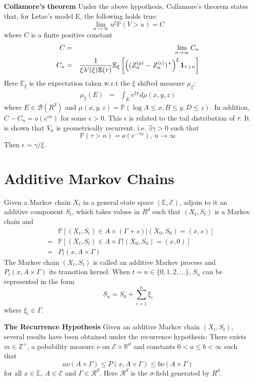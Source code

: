 \documentclass[12pt]{article}
\newcommand{\E}{
        \mathbb{E}
}
\newcommand{\p}{
        \mathbb{P}
}
\newcommand{\I}[1]{
        \mathbf 1_{#1}
}
\begin{document}
{\bf Collamore's theorem}
Under the above hypothesis, Collamore's theorem states that, for
Letac's model E, the following holds true:
\[
\lim_{u \to \infty} u^\xi \p(V > u) = C
\]
where $C$ is a finite positive constant
\begin{eqnarray*}
  C &=& \lim_{n \to \infty} C_n \\
  C_n &=&     {1 \over \xi \lambda'(\xi) \E(\tau)}
    \E_\xi \left[
    \left(
    (Z^{(p)}_n - Z^{(c)}_n)^+
    \right)^\xi \I{\tau > n}
    \right]
\end{eqnarray*}
Here $\E_{\xi}$ is the expectation taken w.r.t the $\xi$ shifted
measure $\mu_\xi$:
\begin{eqnarray*}
  \mu_\xi(E) &=& \int_E e^{\xi x} d\mu(x, y, z)
\end{eqnarray*}
where $E \in \mathcal B(R^3)$ and $\mu(x, y, z) = \p(\log A \leq x, B
\leq y, D \leq z)$. In addition, $C - C_n = o(e^{\epsilon n})$ for
some $\epsilon > 0$. This $\epsilon$ is related to the tail
distribution of $\tau$. It is shown that $V_n$ is geometrically
recurrent, i.e. $\exists \gamma > 0$ such that
\[
\p(\tau > n) = o(e^{-\gamma n}) \text{, } n \to \infty
\]
Then $\epsilon = \gamma/\xi$.


\section{Additive Markov Chains}
Given a Markov chain $X_t$ in a general state space $(\mathds E,
\mathscr E)$, adjoin to it an additive component $S_t$,
which takes values in $R^d$ such that $(X_t, S_t) $ is a Markov chain
and
\begin{eqnarray*}
&& \p[(X_t, S_t) \in A \times (\Gamma + s) | (X_0, S_0) = (x, s)] \\
&=& \p[(X_t, S_t) \in A \times \Gamma | (X_0, S_0) = (x, 0)] \\
&=& P_t(x, A \times \Gamma)
\end{eqnarray*}
The Markov chain $(X_t, S_t)$ is called an additive Markov process and
$P_t(x, A \times \Gamma)$ its transition kernel.
When $t = n \in \{0, 1, 2, \dots\}$, $S_n$ can be represented in the
form
\[
S_n = S_0 + \sum_{i=1}^n \xi_i
\]
where $\xi_i \in \Gamma$.

{\bf The Recurrence Hypothesis}
Given an additive Markov chain $(X_t, S_t)$, several results have been
obtained under the recurrence hypothesis: There exists $m \in \mathds
Z^+$, a pobability measure $\nu$ on $\mathscr E \times \mathds R^d$
and constants $0 < a \leq b < \infty$ such that
\[
a \nu(A \times \Gamma) \leq P(x, A \times \Gamma) \leq b \nu(A \times \Gamma)
\]
for all $x \in \mathds E$, $A \in \mathscr E$ and $\Gamma \in \mathscr
R^d$. Here $\mathscr R^d$ is the $\sigma$-field generated by $R^d$.
\end{document}
